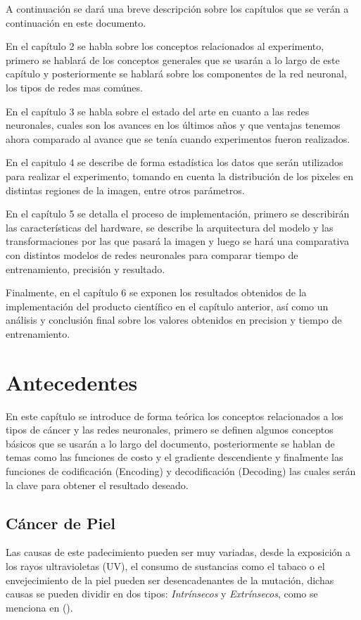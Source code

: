 A continuación se dará una breve descripción sobre los capítulos que se verán a continuación en este documento.

En el capítulo 2 se habla sobre los conceptos relacionados al experimento, primero se hablará de los conceptos generales que se usarán a lo largo de este capítulo y posteriormente se hablará sobre los componentes de la red neuronal, los tipos de redes mas comúnes. 

En el capítulo 3 se habla sobre el estado del arte en cuanto a las redes neuronales, cuales son los avances en los últimos años y que ventajas tenemos ahora comparado al avance que se tenía cuando experimentos fueron realizados.

En el capitulo 4 se describe de forma estadística los datos que serán utilizados para realizar el experimento, tomando en cuenta la distribución de los pixeles en distintas regiones de la imagen, entre otros parámetros. 

En el capítulo 5 se detalla el proceso de implementación, primero se describirán las características del hardware, se describe la arquitectura del modelo y las transformaciones por las que pasará la imagen y luego se hará una comparativa con distintos modelos de redes neuronales para comparar tiempo de entrenamiento, precisión y resultado.

Finalmente, en el capítulo 6 se exponen los resultados obtenidos de la implementación del producto científico en el capítulo anterior, así como un análisis y conclusión final sobre los valores obtenidos en precision y tiempo de entrenamiento. 

\chapter{Antecedentes}
En este capítulo se introduce de forma teórica los conceptos relacionados a los tipos de cáncer y las redes neuronales, primero se definen algunos conceptos básicos que se usarán a lo largo del documento, posteriormente se hablan de temas como las funciones de costo y el gradiente descendiente y finalmente las funciones de codificación (Encoding) y decodificación (Decoding) las cuales serán la clave para obtener el resultado deseado.

\section{Cáncer de Piel}

Las causas de este padecimiento pueden ser muy variadas, desde la exposición a los rayos ultravioletas (UV), el consumo de sustancias como el tabaco o el envejecimiento de la piel pueden ser desencadenantes de la mutación, dichas causas se pueden dividir en dos tipos: \emph{Intrínsecos} y \emph{Extrínsecos}, como se menciona en \citeauthor{skin_1} (\citeyear{skin_1}).


